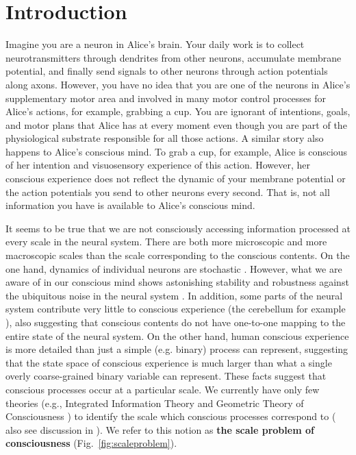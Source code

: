 \documentclass[utf8]{article}
\begin{document}
    \newpage
	\section{Introduction}

		Imagine you are a neuron in Alice's brain. Your daily work is to collect neurotransmitters through dendrites from other neurons, accumulate membrane potential, and finally send signals to other neurons through action potentials along axons. However, you have no idea that you are one of the neurons in Alice's supplementary motor area and involved in many motor control processes for Alice's actions, for example, grabbing a cup. You are ignorant of intentions, goals, and motor plans that Alice has at every moment even though you are part of the physiological substrate responsible for all those actions.
		A similar story also happens to Alice's conscious mind. To grab a cup, for example, Alice is conscious of her intention and visuosensory experience of this action. However, her conscious experience does not reflect the dynamic of your membrane potential or the action potentials you send to other neurons every second. That is, not all information you have is available to Alice's conscious mind.

		
		It seems to be true that we are not consciously accessing information processed at every scale in the neural system. There are both more microscopic and more macroscopic scales than the scale corresponding to the conscious contents. On the one hand, dynamics of individual neurons are stochastic \citep{Goldwyn2011, White2000}. However, what we are aware of in our conscious mind shows astonishing stability and robustness against the ubiquitous noise in the neural system \citep{mathis1995computational}. In addition, some parts of the neural system contribute very little to conscious experience (the cerebellum for example \citep{lemon2010life}), also suggesting that conscious contents do not have one-to-one mapping to the entire state of the neural system. On the other hand, human conscious experience is more detailed than just a simple (e.g. binary) process can represent, suggesting that the state space of conscious experience is much larger than what a single overly coarse-grained binary variable can represent. These facts suggest that conscious processes occur at a particular scale. We currently have only few theories (e.g., Integrated Information Theory \citep{hoel2016can} and Geometric Theory of Consciousness \citep{fekete2011towards,fekete2012lack}) to identify the scale which conscious processes correspond to ( also see discussion in \cite{fekete2016system}). We refer to this notion as \textbf{the scale problem of consciousness} (Fig.~\ref{fig:scaleproblem}).
\end{document}
